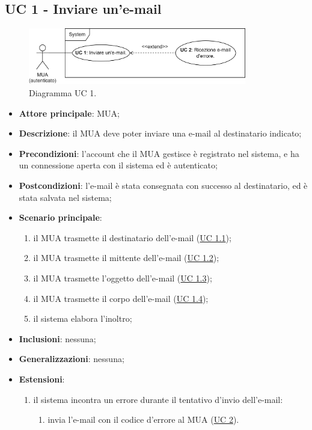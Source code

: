 \subsection{UC 1 - Inviare un'e-mail} \label{sec:UC1}
    \begin{figure}[h]
        \includegraphics[width=0.85\textwidth]{sections/uc_imgs/UC01.png}
        \centering
        \caption{Diagramma UC 1.}
    \end{figure}
    \begin{itemize}
        \item \textbf{Attore principale}: MUA;
        \item \textbf{Descrizione}: il MUA deve poter inviare una e-mail al destinatario indicato;
        \item \textbf{Precondizioni}: l’account che il MUA gestisce è registrato nel sistema, e ha un connessione aperta con il sistema ed è autenticato;
        \item \textbf{Postcondizioni}: l'e-mail è stata consegnata con successo al destinatario, ed è stata salvata nel sistema;
        \item \textbf{Scenario principale}:
            \begin{enumerate}
                \item il MUA trasmette il destinatario dell'e-mail (\hyperref[sec:UC1.1]{UC 1.1});
                \item il MUA trasmette il mittente dell'e-mail (\hyperref[sec:UC1.2]{UC 1.2});
                \item il MUA trasmette l'oggetto dell'e-mail (\hyperref[sec:UC1.3]{UC 1.3});
                \item il MUA trasmette il corpo dell'e-mail (\hyperref[sec:UC1.4]{UC 1.4});
                \item il sistema elabora l'inoltro;
            \end{enumerate}
        \item \textbf{Inclusioni}: nessuna;
        \item \textbf{Generalizzazioni}: nessuna;
        \item \textbf{Estensioni}: 
            \begin{enumerate}[label=\alph*.]
                \item il sistema incontra un errore durante il tentativo d'invio dell'e-mail:
                \begin{enumerate}[label=\arabic*.]
                    \item invia l'e-mail con il codice d'errore al MUA (\hyperref[sec:UC2]{UC 2}).
                \end{enumerate}
            \end{enumerate}
    \end{itemize}

